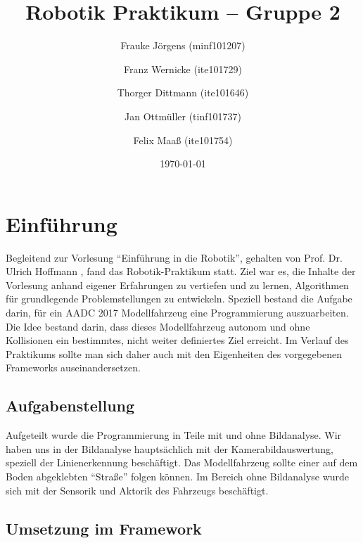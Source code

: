 \documentclass[a4paper,12pt]{report}
\begin{document}

	\title{Robotik Praktikum -- Gruppe 2}
	\author{Frauke Jörgens (minf101207) \and Franz Wernicke (ite101729) \and Thorger Dittmann (ite101646) \and Jan Ottmüller (tinf101737) \and Felix Maaß (ite101754)}
	\date{\today}
	\maketitle

	\tableofcontents


\chapter{Einführung}

	Begleitend zur Vorlesung ``Einführung in die Robotik'', gehalten von Prof. Dr. Ulrich Hoffmann \cite{hoffmann_ws17}, fand das Robotik-Praktikum statt.
	Ziel war es, die Inhalte der Vorlesung anhand eigener Erfahrungen zu vertiefen und zu lernen, Algorithmen für grundlegende Problemstellungen zu entwickeln.
	Speziell bestand die Aufgabe darin, für ein AADC 2017 Modellfahrzeug eine Programmierung auszuarbeiten.
	Die Idee bestand darin, dass dieses Modellfahrzeug autonom und ohne Kollisionen ein bestimmtes, nicht weiter definiertes Ziel erreicht.
	Im Verlauf des Praktikums sollte man sich daher auch mit den Eigenheiten des vorgegebenen Frameworks auseinandersetzen.

\section{Aufgabenstellung}

	Aufgeteilt wurde die Programmierung in Teile mit und ohne Bildanalyse.
	Wir haben uns in der Bildanalyse hauptsächlich mit der Kamerabildauswertung, speziell der Linienerkennung beschäftigt.
	Das Modellfahrzeug sollte einer auf dem Boden abgeklebten ``Straße'' folgen können.
	Im Bereich ohne Bildanalyse wurde sich mit der Sensorik und Aktorik des Fahrzeugs beschäftigt.

\section{Umsetzung im Framework}
\end{document}
